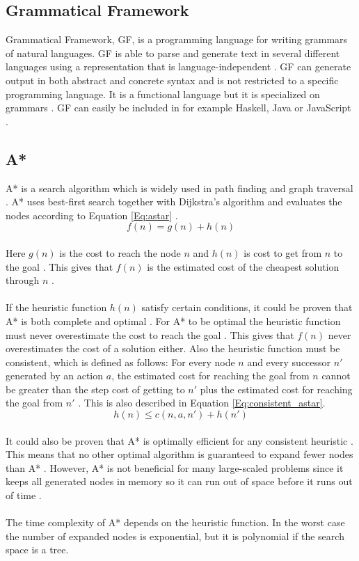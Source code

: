\newpage
\subsection{Grammatical Framework}
Grammatical Framework, GF, is a programming language for writing grammars of
natural languages. GF is able to parse and generate text in several different
languages using a representation that is language-independent \citep{gf_url}.
GF can generate output in both abstract and concrete syntax and is not
restricted to a specific programming language. It is a functional language but
it is specialized on grammars \citep{gf_url}. 
GF can easily be included in for example Haskell, Java or JavaScript \citep{gf_url}.

\subsection{A*}
A* is a search algorithm which is widely used in path finding and graph
traversal \citep{astar_url}. A* uses best-first search together with Dijkstra's
algorithm and evaluates the nodes according to Equation \ref{Eq:astar}
\citep{astar_url}. \\
\begin{equation}
f(n) = g(n) + h(n)
\label{Eq:astar}
\end{equation}\\
Here $g(n)$ is the cost to reach the node $n$ and $h(n)$ is cost to get from $n$
to the goal \citep{astar_url}. This gives that $f(n)$ is the estimated
cost of the cheapest solution through $n$ \citep{astar_url}. 
\\\\
If the heuristic function $h(n)$ satisfy certain conditions, it could be proven
that A* is both complete and optimal \citep{astar_ai}. For A* to be optimal the
heuristic function must never overestimate the cost to reach the goal
\citep{astar_ai}. This gives that $f(n)$ never overestimates the cost of a
solution either. Also the heuristic function must be consistent, which is
defined as follows: For every node $n$ and every successor $n'$ generated by an
action $a$, the estimated cost for reaching the goal from $n$ cannot be greater
than the step cost of getting to $n'$ plus the estimated cost for reaching the
goal from $n'$ \citep{astar_ai}. This is also described in Equation
\ref{Eq:consistent_astar}.\\
\begin{equation}
h(n) \leq c(n, a, n') + h(n')
\label{Eq:consistent_astar}
\end{equation}\\
It could also be proven that A* is optimally efficient for any consistent
heuristic \citep{astar_ai}. This means that no other optimal algorithm is
guaranteed to expand fewer nodes than A* \citep{astar_ai}. However, A* is not
beneficial for many large-scaled problems since it keeps all generated nodes in
memory so it can run out of space before it runs out of time
\citep{astar_ai}.\\\\ The time complexity of A* depends on the heuristic
function. In the worst case the number of expanded nodes is exponential, but it
is polynomial if the search space is a tree.
